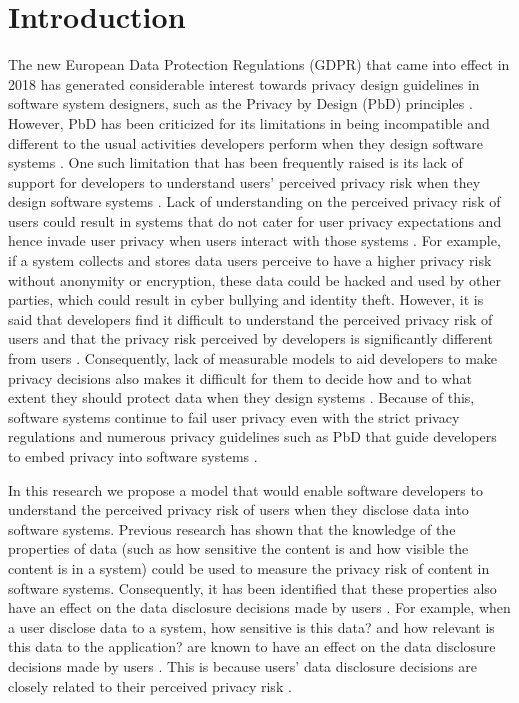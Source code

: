 \documentclass[10pt]{article}
\begin{document}
\section{Introduction}
The new European Data Protection Regulations (GDPR) that came into effect in 2018 has generated considerable interest towards privacy design guidelines in software system designers, such as the Privacy by Design (PbD) principles \cite {wagner2016national}. However, PbD has been criticized for its limitations in being incompatible and different to the usual activities developers perform when they design software systems \cite {senarath2017designing, ayalon2018crowdsourcing}. One such limitation that has been frequently raised is its lack of support for developers to understand users' perceived privacy risk when they design software systems \cite {ayalon2018crowdsourcing}. Lack of understanding on the perceived privacy risk of users could result in systems that do not cater for user privacy expectations and hence invade user privacy when users interact with those systems \cite {senarath2018why}. For example, if a system collects and stores data users perceive to have a higher privacy risk without anonymity or encryption, these data could be hacked and used by other parties, which could result in cyber bullying and identity theft. However, it is said that developers find it difficult to understand the perceived privacy risk of users and that the privacy risk perceived by developers is significantly different from users \cite {senarath2018under}. Consequently, lack of measurable models to aid developers to make privacy decisions also makes it difficult for them to decide how and to what extent they should protect data when they design systems \cite {oetzel2014systematic, senarath2018why}. Because of this, software systems continue to fail user privacy even with the strict privacy regulations \cite {wagner2016national} and numerous privacy guidelines such as PbD that guide developers to embed privacy into software systems \cite {senarath2018why}.

In this research we propose a model that would enable software developers to understand the perceived privacy risk of users when they disclose data into software systems. Previous research has shown that the knowledge of the properties of data (such as how sensitive the content is and how visible the content is in a system) could be used \cite {maximilien2009privacy} to measure the privacy risk of content in software systems. Consequently, it has been identified that these properties also have an effect on the data disclosure decisions made by users \cite {malheiros2013fairly}. For example, when a user disclose data to a system, how sensitive is this data? and how relevant is this data to the application? are known to have an effect on the data disclosure decisions made by users \cite {malheiros2013fairly}. This is because users' data disclosure decisions are closely related to their perceived privacy risk \cite {kobsa2007privacy, li2010understanding, malhotra2004internet}. 
\end{document}

